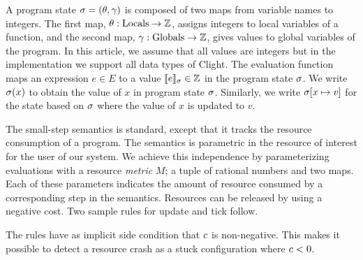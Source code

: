 \documentclass[nocopyrightspace,preprint,pldi]{sigplanconf-pldi15}
\newcommand{\iffull}[2]{\ifx\fullversion\undefined{#2}\else{#1}\fi}
\begin{document}
A program state $\sigma = (\theta, \gamma)$ is composed of two maps
from variable names to integers. The first map, $\theta : \text{Locals}
\to \mathbb{Z}$, assigns integers to local variables of a function, and the
second map, $\gamma : \text{Globals} \to \mathbb{Z}$, gives values to global
variables of the program.  In this article, we assume that all values are
integers but in the implementation we support all data types of Clight.
The evaluation function \evalE{\cdot}{} maps an expression $e \in E$
to a value $\llbracket e \rrbracket_{\sigma} \in \mathbb{Z}$ in the program state $\sigma$.
We write $\sigma(x)$ to obtain the value of $x$ in program state
$\sigma$.
Similarly, we write $\sigma[x \mapsto v]$ for the state based on $\sigma$
where the value of $x$ is updated to $v$.

The small-step semantics is standard, except that it tracks
the resource consumption of a program.  The semantics is parametric in
the resource of interest for the user of our system.  We achieve this
independence by parameterizing evaluations with a resource \emph{metric}
$M$; a tuple of rational numbers and two maps.  Each of these
parameters indicates the amount of resource consumed by a corresponding
step in the semantics.  Resources can be released by using a negative
cost. %
Two sample rules for update and tick follow.
The rules have as implicit side condition that $c$ is
non-negative.  This makes it possible to detect a resource crash as a
stuck configuration where $c<0$.
\end{document}
